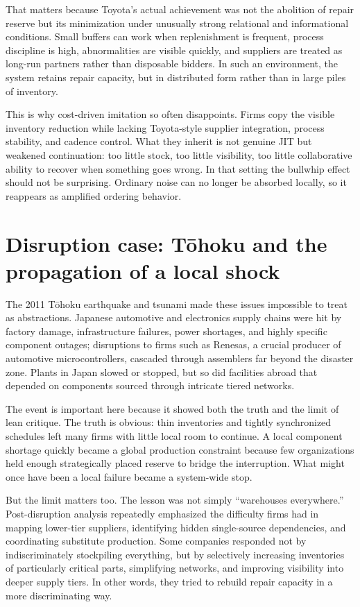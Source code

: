 \documentclass[11pt]{article}
\begin{document}
That matters because Toyota's actual achievement was not the abolition of repair reserve but its minimization under unusually strong relational and informational conditions. Small buffers can work when replenishment is frequent, process discipline is high, abnormalities are visible quickly, and suppliers are treated as long-run partners rather than disposable bidders. In such an environment, the system retains repair capacity, but in distributed form rather than in large piles of inventory.

This is why cost-driven imitation so often disappoints. Firms copy the visible inventory reduction while lacking Toyota-style supplier integration, process stability, and cadence control. What they inherit is not genuine JIT but weakened continuation: too little stock, too little visibility, too little collaborative ability to recover when something goes wrong. In that setting the bullwhip effect should not be surprising. Ordinary noise can no longer be absorbed locally, so it reappears as amplified ordering behavior.

\section{Disruption case: T\=ohoku and the propagation of a local shock}
The 2011 T\=ohoku earthquake and tsunami made these issues impossible to treat as abstractions. Japanese automotive and electronics supply chains were hit by factory damage, infrastructure failures, power shortages, and highly specific component outages; disruptions to firms such as Renesas, a crucial producer of automotive microcontrollers, cascaded through assemblers far beyond the disaster zone. Plants in Japan slowed or stopped, but so did facilities abroad that depended on components sourced through intricate tiered networks.

The event is important here because it showed both the truth and the limit of lean critique. The truth is obvious: thin inventories and tightly synchronized schedules left many firms with little local room to continue. A local component shortage quickly became a global production constraint because few organizations held enough strategically placed reserve to bridge the interruption. What might once have been a local failure became a system-wide stop.

But the limit matters too. The lesson was not simply ``warehouses everywhere.'' Post-disruption analysis repeatedly emphasized the difficulty firms had in mapping lower-tier suppliers, identifying hidden single-source dependencies, and coordinating substitute production. Some companies responded not by indiscriminately stockpiling everything, but by selectively increasing inventories of particularly critical parts, simplifying networks, and improving visibility into deeper supply tiers. In other words, they tried to rebuild repair capacity in a more discriminating way.
\end{document}
